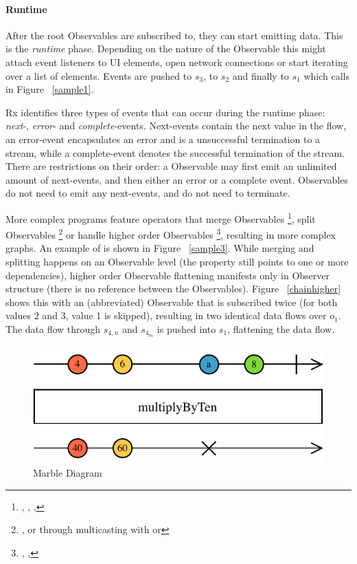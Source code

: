 \paragraph{Runtime} After the root Observables are subscribed to, they
can start emitting data.  This is the \emph{runtime} phase.  Depending
on the nature of the Observable this might attach event listeners to UI
elements, open network connections or start iterating over a list of
elements.  Events are pushed to $ s_3 $, to $ s_2 $ and finally to $ s_1
$ which calls  in Figure~%
\ref{sample1}.

Rx identifies three types of events that can occur during the runtime
phase:  \emph{next}-, \emph{error}- and \emph{complete}-events.
Next-events contain the next value in the flow, an error-event
encapsulates an error and is a unsuccessful termination to a stream,
while a complete-event denotes the successful termination of the stream.
There are restrictions on their order:  a Observable may first emit an
unlimited amount of next-events, and then either an error or a complete
event.  Observables do not need to emit any next-events, and do not need
to terminate.

More complex programs feature operators that merge Observables%
\footnote{ , , , 
}, split Observables%
\footnote{ , or through multicasting with  or
 } or handle higher order Observables%
\footnote{ , ,  },
resulting in more complex graphs.  An example of  is shown
in Figure~%
\ref{sample3}.  While merging and splitting happens on an Observable
level (the  property still points to one or more
dependencies), higher order Observable flattening manifests only in
Observer structure (there is no reference between the Observables).
Figure~%
\ref{chainhigher} shows this with an (abbreviated) 
Observable that is subscribed twice (for both values $ 2 $ and $ 3 $,
value 1 is skipped), resulting in two identical data flows over $ o_1 $.
The data flow through $ s_{4,n} $ and $ s_{4_m} $ is pushed into $ s_1 $,
flattening the data flow.

\begin{figure}[t]
    \centering
    \includegraphics[width=\columnwidth]{images/marble-diagram.pdf}
    \caption{Marble Diagram}%
    \label{marblediagram-image}
\end{figure}

